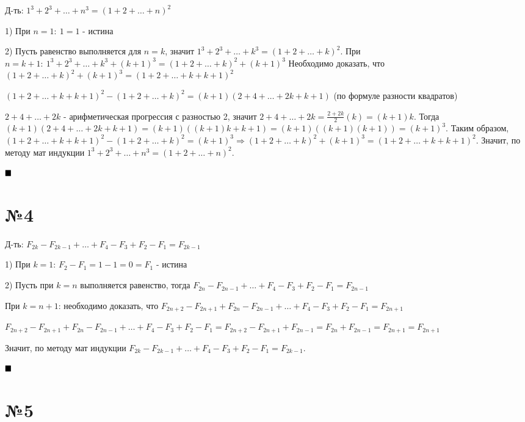\documentclass[a4paper, 16pt]{article}
\newenvironment{proof}[1][Доказательство]{%
	\begin{trivlist}
		\item[\hskip \labelsep {\bfseries #1:}]
		\item \hspace{15pt}
	}{
		$ \hfill\blacksquare $
	\end{trivlist}
	\hfill\break
}
\begin{document}
	Д-ть: $1 ^3 + 2^3 + \dots + n^3 = (1 + 2 + \dots + n)^2$

	\begin{proof}
		1) При $n = 1 :\ 1 = 1$ - истина
		
		2) Пусть равенство выполняется для $n = k$, значит $1 ^3 + 2^3 + \dots + k^3 = (1 + 2 + \dots + k)^2$. При $n = k + 1: \ 1 ^3 + 2^3 + \dots + k^3 + (k + 1) ^3= (1 + 2 + \dots + k)^2 + (k + 1)^3$ Необходимо доказать, что $(1 + 2 + \dots + k)^2 + (k + 1)^3 = 
		(1 + 2 + \dots + k + k + 1)^2$
		
		$(1 + 2 + \dots + k + k + 1)^2 - (1 + 2 + \dots + k)^2 = (k + 1)(2 + 4 + \dots + 2k + k + 1)$ (по формуле разности квадратов)
		
		$2 + 4 + \dots + 2k$ - арифметическая прогрессия с разностью 2, значит $2 + 4 + \dots + 2k = \frac{2 + 2k}{2}(k) = (k  +1)k$. Тогда $(k + 1)(2 + 4 + \dots + 2k + k + 1) = (k + 1)((k  +1)k + k + 1) = (k  +1)((k+1)(k + 1)) = (k  + 1)^3$. Таким образом, 
		$(1 + 2 + \dots + k + k + 1)^2 - (1 + 2 + \dots + k)^2 = (k  + 1)^3 \Rightarrow (1 + 2 + \dots + k)^2 + (k + 1)^3 = (1 + 2 + \dots + k + k + 1)^2$. Значит, по методу мат индукции $1 ^3 + 2^3 + \dots + n^3 = (1 + 2 + \dots + n)^2$.
	\end{proof}

\section*{№4}

	Д-ть: $ F_{2k} - F_{2k-1} + \dots + F_4 - F_3 + F_2 - F_1 = F_{2k-1}  $
	
	\begin{proof}
		1) При $k = 1$: $F_2 - F_1 = 1 - 1 = 0 = F_1$ - истина
		
		2) Пусть при $ k = n$ выполняется равенство, тогда $ F_{2n} - F_{2n-1} + \dots + F_4 - F_3 + F_2 - F_1 = F_{2n-1}  $
		
		При $k = n + 1$: необходимо доказать, что $ F_{2n + 2} - F_{2n+1} + F_{2n} - F_{2n-1} + \dots + F_4 - F_3 + F_2 - F_1 = F_{2n+1}  $
		
		$ F_{2n + 2} - F_{2n+1} + F_{2n} - F_{2n-1} + \dots + F_4 - F_3 + F_2 - F_1 = F_{2n+2} - F_{2n+1} + F_{2n-1} = F_{2n} + F_{2n-1} = F_{2n + 1} =  F_{2n + 1} $
		
		Значит, по методу мат индукции $ F_{2k} - F_{2k-1} + \dots + F_4 - F_3 + F_2 - F_1 = F_{2k-1}  $.
	\end{proof}

\section*{№5}
\end{document}
